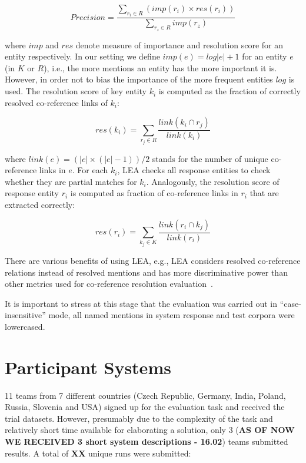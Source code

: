 \documentclass[11pt]{article}
\begin{document}
\begin{equation*}
Precision = \frac{\sum_{r_{i} \in R} (imp(r_i) \times res(r_{i}))}
              {\sum_{r_{z} \in R} imp(r_{z})}
\end{equation*}

\noindent where $imp$ and $res$ denote measure of importance and resolution score for an entity respectively.
In our setting we define $imp(e) = log|e|+1$ for an entity $e$ (in $K$ or $R$), i.e., the more mentions 
an entity has the more important it is. However, in order not to bias the importance of the more frequent entities $log$ 
is used. The resolution score of key entity $k_i$ is computed as the fraction of correctly resolved co-reference 
links of $k_i$: 

\begin{equation*}
res(k_i) = \sum_{r_{j} \in R} \frac{link(k_{i} \cap r_{j})}{link(k_{i})}
\end{equation*}

\noindent where $link(e) = (|e| \times (|e|-1))/2$ stands for the number of unique 
co-reference links in $e$. For each $k_i$, LEA checks all response entities to check whether 
they are partial matches for $k_i$. Analogously, the resolution score of response entity $r_i$ is
computed as fraction of co-reference links in $r_i$ that are extracted correctly:

\begin{equation*}
res(r_i) = \sum_{k_{j} \in K} \frac{link(r_{i} \cap k_{j})}{link(r_{i})}
\end{equation*}

There are various benefits of using LEA, e.g., LEA considers resolved co-reference relations 
instead of resolved mentions and has more discriminative power than other metrics used
for co-reference resolution evaluation~\cite{DBLP:conf-acl-Moosavi016}.

It is important to stress at this stage that the evaluation was carried out in ``case-insensitive'' 
mode, all named mentions in system response and test corpora were lowercased.

\section{Participant Systems}
\label{sec:participants}
 
11 teams from 7 different countries (Czech Republic, Germany, India, Poland, Russia, Slovenia and USA) signed up for the evaluation task and received the trial datasets. However, presumably due to the complexity of the task and relatively short
time available for elaborating a solution, only 3 (\textbf{AS OF NOW WE RECEIVED 3 short system descriptions - 16.02}) teams submitted results. A total of \textbf{XX} unique runs were submitted: 
\end{document}
